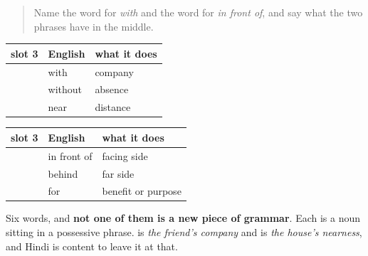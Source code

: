 \label{lesson:HI-C93-repaso-sambandh}



\begin{quote}
Name the word for \emph{with} and the word for \emph{in front of}, and say what the two phrases have in the middle.
\end{quote}

\begin{grammarlens}[title={Grammar Lens: the six}]
\noindent
\begin{tabularx}{\linewidth}{@{}>{\raggedright\arraybackslash}X>{\raggedright\arraybackslash}X>{\raggedright\arraybackslash}X@{}}
\toprule
\textbf{slot 3} & \textbf{English} & \textbf{what it does} \\
\midrule
\hi{साथ} & with & company \\
\hi{बिना} & without & absence \\
\hi{पास} & near & distance \\
\bottomrule
\end{tabularx}
\end{grammarlens}

\begin{grammarlens}[title={Grammar Lens: and the other three}]
\noindent
\begin{tabularx}{\linewidth}{@{}>{\raggedright\arraybackslash}X>{\raggedright\arraybackslash}X>{\raggedright\arraybackslash}X@{}}
\toprule
\textbf{slot 3} & \textbf{English} & \textbf{what it does} \\
\midrule
\hi{सामने} & in front of & facing side \\
\hi{पीछे} & behind & far side \\
\hi{लिए} & for & benefit or purpose \\
\bottomrule
\end{tabularx}

Six words, and \textbf{not one of them is a new piece of grammar}. Each is a noun sitting in a possessive phrase. \textbf{  } is \emph{the friend's company} and \textbf{  } is \emph{the house's nearness}, and Hindi is content to leave it at that.
\end{grammarlens}

